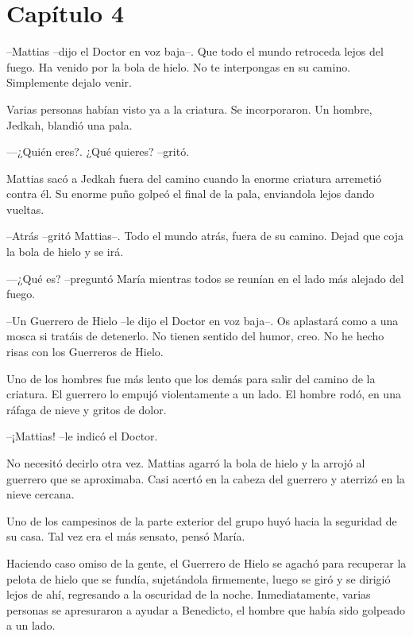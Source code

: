 \chapter*{Capítulo 4}

--Mattias --dijo el Doctor en voz baja--. Que todo el mundo retroceda lejos del fuego. Ha venido por la bola de hielo. No te interpongas en su camino. Simplemente dejalo venir. 



Varias personas habían visto ya a la criatura. Se incorporaron. Un hombre, Jedkah, blandió una pala. 


—¿Quién eres?. ¿Qué quieres? --gritó.



Mattias sacó a Jedkah fuera del camino cuando la enorme criatura arremetió contra él. Su enorme puño golpeó el final de la pala, enviandola lejos dando vueltas.



--Atrás --gritó Mattias--. Todo el mundo atrás, fuera de su camino. Dejad que coja la bola de hielo y se irá. 



—¿Qué es? --preguntó María mientras todos se reunían en el lado más alejado del fuego.



--Un Guerrero de Hielo --le dijo el Doctor en voz baja--. Os aplastará como a una mosca si tratáis de detenerlo. No tienen sentido del humor, creo. No he hecho risas con los Guerreros de Hielo.



Uno de los hombres fue más lento que los demás para salir del camino de la criatura. El guerrero lo empujó violentamente a un lado. El hombre rodó, en una ráfaga de nieve y gritos de dolor.



--¡Mattias! --le indicó el Doctor.



No necesitó decirlo otra vez. Mattias agarró la bola de hielo y la arrojó al guerrero que se aproximaba. Casi acertó en la cabeza del guerrero y aterrizó en la nieve cercana.



Uno de los campesinos de la parte exterior del grupo huyó hacia la seguridad de su casa. Tal vez era el más sensato, pensó María.



Haciendo caso omiso de la gente, el Guerrero de Hielo se agachó para recuperar la pelota de hielo que se fundía, sujetándola firmemente, luego se giró y se dirigió lejos de ahí, regresando a la oscuridad de la noche. Inmediatamente, varias personas se apresuraron a ayudar a Benedicto, el hombre que había sido golpeado a un lado.



